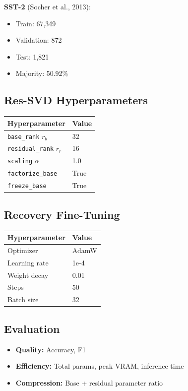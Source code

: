 \textbf{SST-2} (Socher et al., 2013):
\begin{itemize}
\item Train: 67,349
\item Validation: 872
\item Test: 1,821
\item Majority: 50.92\%

\end{itemize}
\subsection{Res-SVD Hyperparameters}

\begin{table}[H]
\centering
\small
\begin{tabular}{ll}
\toprule
\textbf{Hyperparameter} & \textbf{Value} \\
\midrule
\texttt{base\_rank} $r_b$ & 32 \\
\texttt{residual\_rank} $r_r$ & 16 \\
\texttt{scaling} $\alpha$ & 1.0 \\
\texttt{factorize\_base} & True \\
\texttt{freeze\_base} & True \\
\bottomrule
\end{tabular}
\end{table}

\subsection{Recovery Fine-Tuning}

\begin{table}[H]
\centering
\small
\begin{tabular}{ll}
\toprule
\textbf{Hyperparameter} & \textbf{Value} \\
\midrule
Optimizer & AdamW \\
Learning rate & 1e-4 \\
Weight decay & 0.01 \\
Steps & 50 \\
Batch size & 32 \\
\bottomrule
\end{tabular}
\end{table}

\subsection{Evaluation}

\begin{itemize}
\item \textbf{Quality:} Accuracy, F1
\item \textbf{Efficiency:} Total params, peak VRAM, inference time
\item \textbf{Compression:} Base + residual parameter ratio

\end{itemize}
